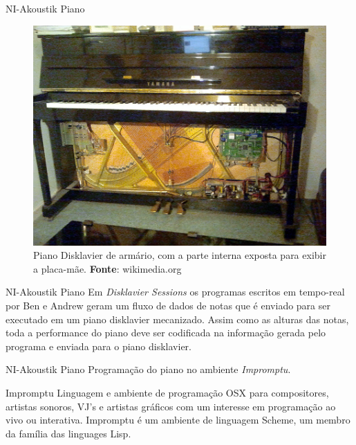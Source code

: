 \documentclass[aspectratio=169]{beamer}
\begin{document}
\begin{frame}{NI-Akoustik Piano}
\begin{figure}[h]
  \centering
  \includegraphics[scale=0.2]{imagens/disklavier.jpg}
  \caption{Piano Disklavier de armário, com a parte interna exposta para exibir a placa-mãe. \textbf{Fonte}: wikimedia.org}
  \label{fig:disklavier}
\end{figure}
\end{frame}

\begin{frame}{NI-Akoustik Piano}
Em \emph{Disklavier Sessions} os programas escritos em tempo-real por Ben e Andrew geram um fluxo de dados de notas que é enviado para ser executado em um piano disklavier mecanizado. Assim como as alturas das notas, toda a performance do piano deve ser codificada na informação gerada pelo programa e enviada para o piano disklavier.
\end{frame}

\begin{frame}{NI-Akoustik Piano}
Programação do piano no ambiente \emph{Impromptu}. 
\end{frame}

\begin{frame}{Impromptu}
Linguagem e ambiente de programação OSX para compositores, artistas sonoros, VJ's e artistas gráficos  com um interesse em programação ao vivo ou interativa. Impromptu  é um ambiente de linguagem Scheme, um membro da família das linguages Lisp.
\end{frame}
\end{document}

